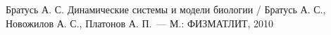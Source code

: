     \begin{thebibliography}{0}
         Братусь А. С. Динамические системы и модели биологии / Братусь А. С., Новожилов А. С., Платонов А. П.~--- М.: ФИЗМАТЛИТ, 2010
        
    \end{thebibliography}